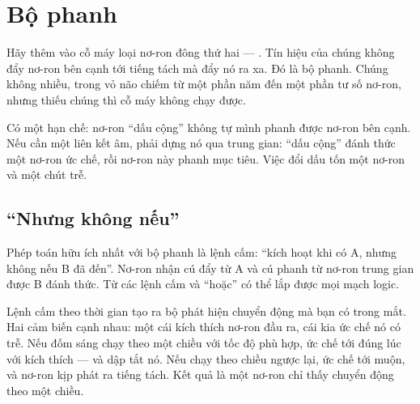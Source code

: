 \chapter{Bộ phanh}

Hãy thêm vào cỗ máy loại nơ-ron đông thứ hai --- . Tín hiệu của chúng không đẩy nơ-ron bên cạnh tới tiếng tách mà đẩy nó ra xa. Đó là bộ phanh. Chúng không nhiều, trong vỏ não chiếm từ một phần năm đến một phần tư số nơ-ron, nhưng thiếu chúng thì cỗ máy không chạy được.

Có một hạn chế: nơ-ron ``dấu cộng'' không tự mình phanh được nơ-ron bên cạnh. Nếu cần một liên kết âm, phải dựng nó qua trung gian: ``dấu cộng'' đánh thức một nơ-ron ức chế, rồi nơ-ron này phanh mục tiêu. Việc đổi dấu tốn một nơ-ron và một chút trễ.

\section*{``Nhưng không nếu''}

Phép toán hữu ích nhất với bộ phanh là lệnh cấm: ``kích hoạt khi có A, nhưng không nếu B đã đến''. Nơ-ron nhận cú đẩy từ A và cú phanh từ nơ-ron trung gian được B đánh thức. Từ các lệnh cấm và ``hoặc'' có thể lắp được mọi mạch logic.


Lệnh cấm theo thời gian tạo ra bộ phát hiện chuyển động mà bạn có trong mắt. Hai cảm biến cạnh nhau: một cái kích thích nơ-ron đầu ra, cái kia ức chế nó có trễ. Nếu đốm sáng chạy theo một chiều với tốc độ phù hợp, ức chế tới đúng lúc với kích thích --- và dập tắt nó. Nếu chạy theo chiều ngược lại, ức chế tới muộn, và nơ-ron kịp phát ra tiếng tách. Kết quả là một nơ-ron chỉ thấy chuyển động theo một chiều.

